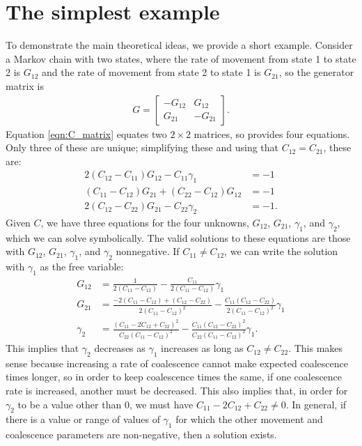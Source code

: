 \documentclass{article}
\begin{document}
\section{The simplest example}
\label{ss:simple_example}

To demonstrate the main theoretical ideas,
we provide a short example.
Consider a Markov chain with two states, 
where the rate of movement from state 1 to state 2 is $G_{12}$
and the rate of movement from state 2 to state 1 is $G_{21}$,
so the generator matrix is
\begin{align*}
G = 
    \begin{bmatrix}
        -G_{12}  & G_{12} \\
         G_{21}  & -G_{21}
    \end{bmatrix}.
\end{align*}
Equation \ref{eqn:C_matrix} equates two $2 \times 2$ matrices,
so provides four equations. Only three of these are unique;
simplifying these and using that $C_{12} = C_{21}$, these are:
\begin{align*}
    2 \left(C_{12} - C_{11} \right) G_{12} - C_{11} \gamma_1 &= -1 \\
    \left(C_{11} - C_{12} \right) G_{21} + \left(C_{22} - C_{12}\right) G_{12} &= -1 \\
    2 \left( C_{12} - C_{22} \right) G_{21} - C_{22} \gamma_2 &= -1 .
\end{align*}
Given $C$, we have three equations for the four unknowns, 
$G_{12}$, $G_{21}$, $\gamma_{1}$, and $\gamma_{2}$,
which we can solve symbolically.
The valid solutions to these equations are those with $G_{12}$, $G_{21}$, $\gamma_1$,
and $\gamma_2$ nonnegative.
If $C_{11} \neq C_{12}$, 
we can write the solution with $\gamma_1$ as the free variable:
\begin{align*}
G_{12} &= \frac{1}{2(C_{11} - C_{12})} - \frac{C_{11}}{2(C_{11} - C_{12})}\gamma_1 \\
G_{21} &= \frac{-2(C_{11} - C_{12}) + (C_{12} - C_{22})}{2(C_{11} - C_{12})^2}
	- \frac{C_{11}(C_{12} - C_{22})}{2(C_{11} - C_{12})^2}\gamma_1 \\
\gamma_2 &= \frac{(C_{11} - 2C_{12} + C_{22})^2}{C_{22}(C_{11} - C_{12})^2}
	- \frac{C_{11}(C_{12} - C_{22})^2}{C_{22}(C_{11} - C_{12})^2}\gamma_1.
\end{align*}
This implies that $\gamma_2$ decreases as $\gamma_1$ increases as long as $C_{12} \neq C_{22}$.
This makes sense because
increasing a rate of coalescence cannot make expected coalescence times longer,
so in order to keep coalescence times the same,
if one coalescence rate is increased, another must be decreased.
This also implies that, in order for $\gamma_2$ to be a value other than $0$, 
we must have $C_{11} - 2C_{12} + C_{22} \neq 0$.
In general, if there is a value or range of values of $\gamma_1$
for which the other movement and coalescence parameters are non-negative,
then a solution exists.
\end{document}
